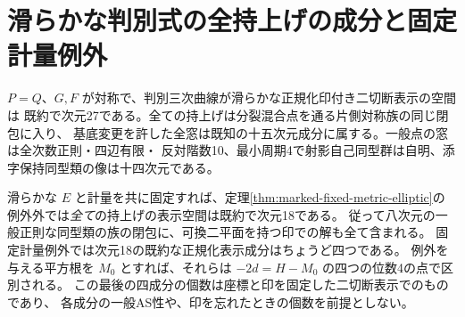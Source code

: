 \section{滑らかな判別式の全持上げの成分と固定計量例外}
\label{sec:marked-smooth-discriminant-components}
\begin{theorem}\label{thm:marked-smooth-discriminant-components}
$P=Q$、$G,F$ が対称で、判別三次曲線が滑らかな正規化印付き二切断表示の空間は
既約で次元27である。全ての持上げは分裂混合点を通る片側対称族の同じ閉包に入り、
基底変更を許した全窓は既知の十五次元成分に属する。一般点の窓は全次数正則・四辺有限・
反対階数10、最小周期4で射影自己同型群は自明、添字保持同型類の像は十四次元である。

滑らかな $E$ と計量を共に固定すれば、定理\ref{thm:marked-fixed-metric-elliptic}の
例外外では\emph{全て}の持上げの表示空間は既約で次元18である。
従って八次元の一般正則な同型類の族の閉包に、可換二平面を持つ印での解も全て含まれる。
固定計量例外では次元18の既約な正規化表示成分はちょうど四つである。
例外を与える平方根を $M_0$ とすれば、それらは $-2d=H-M_0$ の四つの位数4の点で区別される。
この最後の四成分の個数は座標と印を固定した二切断表示でのものであり、
各成分の一般AS性や、印を忘れたときの個数を前提としない。
\end{theorem}
